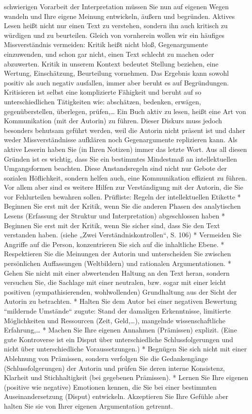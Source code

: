 \documentclass[]{book}
\theoremstyle{definition}
\theoremstyle{definition}
\theoremstyle{definition}
\theoremstyle{remark}
\begin{document}
schwierigen Vorarbeit der Interpretation müssen Sie nun auf eigenen
Wegen wandeln und Ihre eigene Meinung entwickeln, äußern und begründen.
Aktives Lesen heißt nicht nur einen Text zu verstehen, sondern ihn auch
kritisch zu würdigen und zu beurteilen. Gleich von vornherein wollen wir
ein häufiges Missverständnis vermeiden: Kritik heißt nicht bloß,
Gegenargumente einzuwenden, und schon gar nicht, einen Text schlecht zu
machen oder abzuwerten. Kritik in unserem Kontext bedeutet Stellung
beziehen, eine Wertung, Einschätzung, Beurteilung vornehmen. Das
Ergebnis kann sowohl positiv als auch negativ ausfallen, immer aber
beruht es auf Begründungen. Kritisieren ist selbst eine komplizierte
Fähigkeit und beruht auf so unterschiedlichen Tätigkeiten wie:
abschätzen, bedenken, erwägen, gegenüberstellen, überlegen,
prüfen,\ldots{} Ein Buch aktiv zu lesen, heißt eine Art von
Kommunikation (mit der Autorin) zu führen. Dieser Diskurs muss jedoch
besonders behutsam geführt werden, weil die Autorin nicht präsent ist
und daher weder Missverständnisse aufklären noch Gegenargumente
replizieren kann. Als aktive Leserin haben Sie (in Ihren Notizen) immer
das letzte Wort. Aus all diesen Gründen ist es wichtig, dass Sie ein
bestimmtes Mindestmaß an intellektuellen Umgangsformen beachten. Diese
Anstandsregeln sind nicht nur Gebote der sozialen Höflichkeit, sondern
helfen auch, eine Kommunikation effizient zu führen. Vor allem aber sind
es weitere Hilfen zur Verständigung mit der Autorin, die Sie vor
Fehlurteilen bewahren sollen. Prüfliste: Regeln der intellektuellen
Etikette * Beginnen Sie erst mit der Kritik, wenn Sie die anderen Phasen
des analytischen Lesens (Erfassung der Struktur und Interpretation)
abgeschlossen haben * Beginnen Sie erst mit der Kritik, wenn Sie sicher
sind, dass Sie den Text verstanden haben. (siehe „Zwei
Verständniskontrollen``, S. 106) * Vermeiden Sie Angriffe auf die
Person, konzentrieren Sie sich auf die inhaltliche Ebene. * Respektieren
Sie die Meinungen der Autorin und unterscheiden Sie zwischen
persönlichen Auffassungen (Weltbildern) und rationalen Argumentationen.
* Gehen Sie nicht mit einer abwertenden Haltung an den Text heran,
sondern versuchen Sie, die Sachlage mit einer neutralen, bzw. sogar mit
einer leicht positiven (sympathisierenden, wohlwollenden) Grundhaltung
aus der Sicht der Autorin zu betrachten. * Halten Sie dem Autor bei
einer negativen Bewertung ``mildernde Umstände`` zugute: Stand der
damaligen Erkenntnisse, limitierte Möglichkeiten und Ressourcen (Zeit,
Geld,\ldots{}), mangelnde wissenschaftliche Erfahrung,\ldots{} * Machen
Sie Ihre eigenen Annahmen (Prämissen) explizit. (Eine gute Kontroverse
ist ein Disput über unterschiedliche Schlussfolgerungen und nicht über
unterschiedliche Voraussetzungen.) * Begnügen Sie sich nicht mit einer
Ablehnung von Prämissen, sondern verfolgen Sie die Gedankengänge
(Schlussfolgerungen) der Autorin und prüfen Sie deren interne
Konsistenz, Klarheit und Stichhaltigkeit (bei gegebenen Prämissen). *
Lernen Sie Ihre eigenen (positive wie negative) Emotionen kennen, die
Sie bei einer bestimmten Auseinandersetzung (Disput) entwickeln.
Akzeptieren Sie Ihre Gefühle aber halten Sie sie von Ihrer eigenen
Argumentation getrennt.
\end{document}
